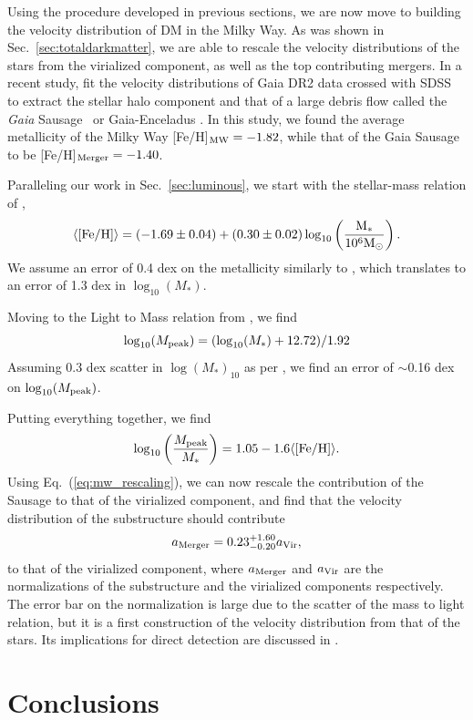\documentclass[twocolumn,preprintnumbers]{aastex6}
\newcommand {\be} {\begin {equation}}
\newcommand {\ee} {\end {equation}}
\DeclareRobustCommand{\Sec}[1]{Sec.~\ref{#1}}
\DeclareRobustCommand{\Eq}[1]{Eq.~(\ref{#1})}
\begin{document}
Using the procedure developed in previous sections, we are now move to building the velocity distribution of DM in the Milky Way. As was shown in \Sec{sec:totaldarkmatter}, we are able to rescale the velocity distributions of the stars from the virialized component, as well as the top contributing mergers. In a recent study, \cite{necib2018} fit the velocity distributions of Gaia DR2 data \citep{2016A&A...595A...4L,2018arXiv180409365G} crossed with SDSS \citep{} to extract the stellar halo component and that of a large debris flow called the \emph{Gaia} Sausage~\citep{2018MNRAS.478..611B,2018ApJ...856L..26M,Myeong:2018kfh,2018ApJ...862L...1D,necib2018,2018arXiv180704290L} or Gaia-Enceladus \citep{2018arXiv180606038H}.  
In this study, we found the average metallicity of the Milky Way [Fe/H]$_{\rm{MW}} = -1.82$, while that of the Gaia Sausage to be [Fe/H]$_{\rm{Merger}} = -1.40$. 

Paralleling our work in \Sec{sec:luminous}, we start with the stellar-mass relation of \cite{Kirby:2013wna}, 
\be
\langle \rm{[Fe/H]} \rangle=(-1.69 \pm 0.04)+(0.30 \pm 0.02) \log_{10} \left(\frac{M_*}{10^6 M_\odot} \right).
\ee
We assume an error of 0.4 dex on the metallicity similarly to \cite{2016ApJ...821....5D}, which translates to an error of 1.3 dex in $\log_{10}(M_*)$.

Moving to the Light to Mass relation from \cite{Garrison-Kimmel:2013eoa}, we find
\be
\log_{10}(M_{\rm{peak}})= (\log_{10} (M_*) + 12.72)/1.92
\ee
Assuming 0.3 dex scatter in $\log(M_*)_{10}$ as per \cite{2016ApJ...821....5D}, we find an error of $\sim$0.16 dex on $\log_{10}(M_{\rm{peak}})$.

Putting everything together, we find
\be \label{eq:mw_rescaling}
\log_{10} \left( \frac{M_{\rm{peak}}}{M_*} \right) = 1.05 - 1.6 \langle \rm{[Fe/H]} \rangle.
\ee
Using \Eq{eq:mw_rescaling}, we can now rescale the contribution of the Sausage to that of the virialized component, and find that the velocity distribution of the substructure should contribute 
\be
a_{\rm{Merger}} = 0.23^{+1.60}_{-0.20} a_{\rm{Vir}},
\ee 
to that of the virialized component, where $a_{\rm{Merger}}$ and $a_{\rm{Vir}}$ are the normalizations of the substructure and the virialized components respectively. The error bar on the normalization is large due to the scatter of the mass to light relation, but it is a first construction of the velocity distribution from that of the stars. Its implications for direct detection are discussed in \cite{necib2018}.

\section{Conclusions}
\end{document}
